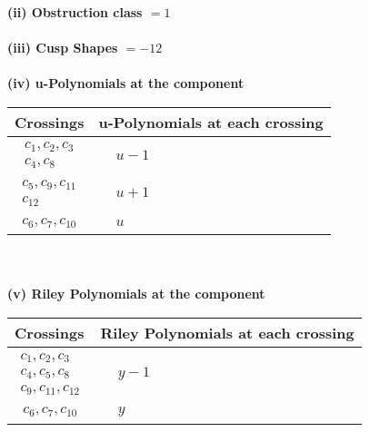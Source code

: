 \documentclass[1p]{elsarticle_modified}
\theoremstyle{definition}
\begin{document}
\flushleft \textbf{(ii) Obstruction class $= 1$}\\~\\
\flushleft \textbf{(iii) Cusp Shapes $= -12$}\\~\\
\newpage\renewcommand{\arraystretch}{1}
\flushleft \textbf{(iv) u-Polynomials at the component}\newline \\
\begin{tabular}{m{50pt}|m{274pt}}
Crossings & \hspace{64pt}u-Polynomials at each crossing \\
\hline $$\begin{aligned}c_{1},c_{2},c_{3}\\c_{4},c_{8}\end{aligned}$$&$\begin{aligned}
&u-1
\end{aligned}$\\
\hline $$\begin{aligned}c_{5},c_{9},c_{11}\\c_{12}\end{aligned}$$&$\begin{aligned}
&u+1
\end{aligned}$\\
\hline $$\begin{aligned}c_{6},c_{7},c_{10}\end{aligned}$$&$\begin{aligned}
&u
\end{aligned}$\\
\hline
\end{tabular}\\~\\
\newpage\renewcommand{\arraystretch}{1}
\flushleft \textbf{(v) Riley Polynomials at the component}\newline \\
\begin{tabular}{m{50pt}|m{274pt}}
Crossings & \hspace{64pt}Riley Polynomials at each crossing \\
\hline $$\begin{aligned}c_{1},c_{2},c_{3}\\c_{4},c_{5},c_{8}\\c_{9},c_{11},c_{12}\end{aligned}$$&$\begin{aligned}
&y-1
\end{aligned}$\\
\hline $$\begin{aligned}c_{6},c_{7},c_{10}\end{aligned}$$&$\begin{aligned}
&y
\end{aligned}$\\
\hline
\end{tabular}\\~\\
\end{document}
